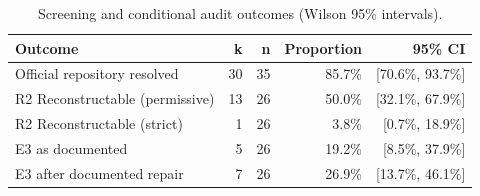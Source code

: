 \begin{table}[t]
\centering
\caption{Screening and conditional audit outcomes (Wilson 95\% intervals).}
\label{tab:endpoints}
\footnotesize
\begin{tabular}{@{}lrrrr@{}}
\toprule
Outcome & k & n & Proportion & 95\% CI \\
\midrule
Official repository resolved & 30 & 35 & 85.7\% & [70.6\%, 93.7\%] \\
R2 Reconstructable (permissive) & 13 & 26 & 50.0\% & [32.1\%, 67.9\%] \\
R2 Reconstructable (strict) & 1 & 26 & 3.8\% & [0.7\%, 18.9\%] \\
E3 as documented & 5 & 26 & 19.2\% & [8.5\%, 37.9\%] \\
E3 after documented repair & 7 & 26 & 26.9\% & [13.7\%, 46.1\%] \\
\bottomrule
\end{tabular}
\end{table}
